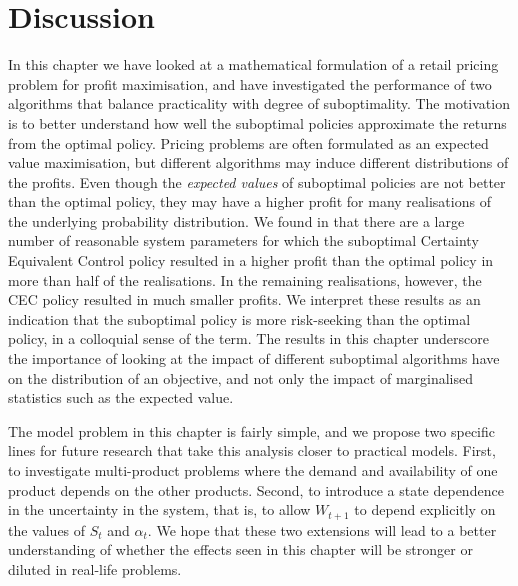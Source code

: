 \documentclass[main.tex]{subfiles}
\begin{document}
\section{Discussion}\label{sec:conclusion}
In this chapter we have looked at a mathematical formulation of a
retail pricing problem for profit maximisation, and have investigated the
performance of two algorithms that balance practicality
with degree of suboptimality. The motivation is to better understand
how well the suboptimal policies approximate the returns from the
optimal policy.
Pricing problems are often formulated as an expected value
maximisation, but different algorithms may induce different
distributions of the profits.
Even though the \emph{expected values} of suboptimal policies are not better
than the optimal policy, they may have a higher profit for many
realisations of the underlying probability distribution.
We found in  that there are a
large number of
reasonable system parameters for which
the suboptimal Certainty Equivalent Control policy resulted in a higher profit
than the optimal policy in more than half of the realisations.
In the remaining realisations, however, the CEC policy resulted in
much smaller profits. We interpret these results as an indication that
the suboptimal policy is more risk-seeking than the optimal policy, in
a colloquial sense of the term.
The results in this chapter underscore the importance of looking at
the impact of
different suboptimal algorithms have on the distribution of
an objective, and not only the impact of
marginalised statistics such as the expected value.

The model problem in this chapter is fairly simple, and
we propose two specific lines for future research that
take this analysis closer to practical models.
First, to investigate multi-product problems where the demand and
availability of one product depends on the other products.
Second, to introduce a state dependence in the uncertainty in the
system, that is, to allow $W_{t+1}$ to depend explicitly on the values
of $S_t$ and $\alpha_t$.
We hope that these two extensions will lead to a better understanding of
whether the effects seen in this chapter will be stronger or diluted
in real-life problems.


\biblio{} %
\end{document}
